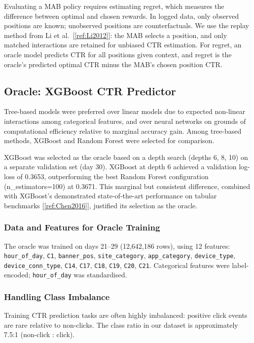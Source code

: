 \documentclass[12pt]{article}
\begin{document}
Evaluating a MAB policy requires estimating regret, which measures the difference between optimal and chosen rewards. In logged data, only observed positions are known; unobserved positions are counterfactuals. We use the replay method from Li et al.~[\ref{ref:Li2012}]: the MAB selects a position, and only matched interactions are retained for unbiased CTR estimation. For regret, an oracle model predicts CTR for all positions given context, and regret is the oracle's predicted optimal CTR minus the MAB's chosen position CTR.

\subsection{Oracle: XGBoost CTR Predictor}

Tree-based models were preferred over linear models due to expected non-linear interactions among categorical features, and over neural networks on grounds of computational efficiency relative to marginal accuracy gain. Among tree-based methods, XGBoost and Random Forest were selected for comparison.

XGBoost was selected as the oracle based on a depth search (depths 6, 8, 10) on a separate validation set (day 30). XGBoost at depth 6 achieved a validation log-loss of 0.3653, outperforming the best Random Forest configuration (n\_estimators=100) at 0.3671. This marginal but consistent difference, combined with XGBoost's demonstrated state-of-the-art performance on tabular benchmarks [\ref{ref:Chen2016}], justified its selection as the oracle.

\subsubsection{Data and Features for Oracle Training}

The oracle was trained on days 21--29 (12,642,186 rows), using 12 features: \texttt{hour\_of\_day}, \texttt{C1}, \texttt{banner\_pos}, \texttt{site\_category}, \texttt{app\_category}, \texttt{device\_type}, \texttt{device\_conn\_type}, \texttt{C14}, \texttt{C17}, \texttt{C18}, \texttt{C19}, \texttt{C20}, \texttt{C21}. Categorical features were label-encoded; \texttt{hour\_of\_day} was standardised.

\subsubsection{Handling Class Imbalance}

Training CTR prediction tasks are often highly imbalanced: positive click events are rare relative to non-clicks. The class ratio in our dataset is approximately 7.5:1 (non-click : click).
\end{document}
